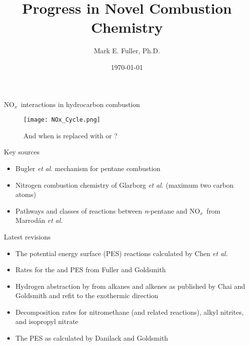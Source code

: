 \documentclass[10pt,presentation]{beamer}
\title{Progress in \soutthick{ Nitrogen } Novel Combustion Chemistry}
\author{Mark E. Fuller, Ph.D.}
\institute{Physico-Chemical Fundamentals of Combustion}
\date{\today}
\newcommand{\nox}{NO$_x$} %
\begin{document}
    
\begin{frame}{\nox\ interactions in hydrocarbon combustion}
    \begin{figure}
        \centering
        \texttt{[image: NOx\_Cycle.png]}
        \caption{And when  is replaced with  or ?}
        \label{fig:NOx_cycle}
    \end{figure}
\end{frame}

\begin{frame}{Key sources}
    \begin{itemize}
        \item Bugler {\it et al.} mechanism for pentane combustion
        \item Nitrogen combustion chemistry of Glarborg {\it et al.} (maximum two carbon atoms)
        \item Pathways and classes of reactions between {\it n}-pentane and \nox\ from Marrod\'an {\it et al.}
    \end{itemize}
\end{frame}

\begin{frame}{Latest revisions}
    \begin{itemize}
        \item The  potential energy surface (PES) reactions calculated by Chen {\it et al.}
        \item Rates for the  and  PES from Fuller and Goldsmith
        \item Hydrogen abstraction by  from alkanes and alkenes as published by Chai and Goldsmith and refit to the exothermic direction
        \item Decomposition rates for nitromethane (and related reactions), alkyl nitrites, and isopropyl nitrate
        \item The  PES as calculated by Danilack and Goldsmith
    \end{itemize}
\end{frame}
\end{document}
